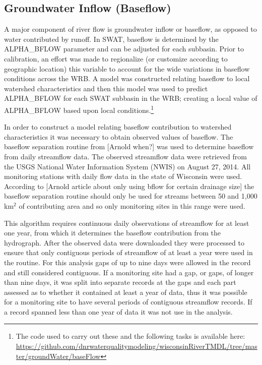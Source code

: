 \subsection{Groundwater Inflow (Baseflow)}
	A major component of river flow is groundwater inflow or baseflow, as opposed to water contributed by runoff. In SWAT, baseflow is determined by the ALPHA\_BFLOW parameter and can be adjusted for each subbasin. Prior to calibration, an effort was made to regionalize (or customize according to geographic location) this variable to account for the wide variations in baseflow conditions across the WRB. A model was constructed relating baseflow to local watershed characteristics and then this model was used to predict ALPHA\_BFLOW for each SWAT subbasin in the WRB; creating a local value of ALPHA\_BFLOW based upon local conditions.\footnote{The code used to carry out these and the following tasks is available here: \url{https://github.com/dnrwaterqualitymodeling/wisconsinRiverTMDL/tree/master/groundWater/baseFlow}}
	
	In order to construct a model relating baseflow contribution to watershed characteristics it was necessary to obtain observed values of baseflow. The baseflow separation routine from [Arnold when?] was used to determine baseflow from daily streamflow data. The observed streamflow data were retrieved from the USGS National Water Information System (NWIS) on August 27, 2014. All monitoring stations with daily flow data in the state of Wisconsin were used.  According to [Arnold article about only using bflow for certain drainage size] the baseflow separation routine should only be used for streams between 50 and 1,000 km$^2$ of contributing area and so only monitoring sites in this range were used. 
	
	This algorithm requires continuous daily observations of streamflow for at least one year, from which it determines the baseflow contribution from the hydrograph.	After the observed data were downloaded they were processed to ensure that only contiguous periods of streamflow of at least a year were used in the routine. For this analysis gaps of up to nine days were allowed in the record and still considered contiguous. If a monitoring site had a gap, or gaps, of longer than nine days, it was split into separate records at the gaps and each part assessed as to whether it contained at least a year of data, thus it was possible for a monitoring site to have several periods of contiguous streamflow records. If a record spanned less than one year of data it was not use in the analysis.
	

